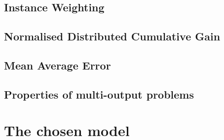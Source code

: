 \subsection{Instance Weighting}
\subsection{Normalised Distributed Cumulative Gain}
\subsection{Mean Average Error}
\subsection{Properties of multi-output problems}
\label{sub:multi}

\section{The chosen model}
\label{sec:chosen}


